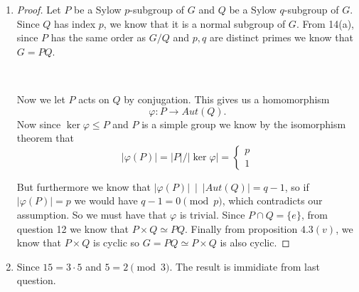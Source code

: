 \begin{exercise}
    \begin{enumerate}[label = (\alph*)]
    \item \begin{proof}
    
    Let $P$ be a Sylow $p$-subgroup of $G$ and $Q$ be a Sylow $q$-subgroup of $G$. Since $Q$ has index $p$, we know that it is a normal subgroup of $G$.
From 14(a), since $P$ has the same order as $G/Q$ and $p,q$ are distinct primes we know that $G = PQ$.

\

Now we let $P$ acts on $Q$ by conjugation. This gives us a homomorphism  \[
    \varphi \colon P \rightarrow Aut(Q)
.\]
Now since $\ker \varphi \leq P$ and $P$ is a simple group we know by the isomorphism theorem that \[|\varphi(P)| = |P|/|\ker \varphi| = \begin{cases}
p\\
1
\end{cases}\]

But furthermore we know that $|\varphi(P)|\ \mid \ |Aut(Q)| = q-1$, so if $|\varphi(P)| = p$ we would have  $q-1 = 0\pmod{p}$, which contradicts our assumption. So we must have that $\varphi$ is trivial.
Since $P\cap Q = \{e\}$, from question 12 we know that $P\times Q \simeq PQ$. 
Finally from proposition $4.3(v)$, we know that  $P\times Q$ is cyclic so $G = PQ \simeq P\times Q$ is also cyclic.
\end{proof}
    \item Since $15 = 3\cdot 5$ and  $5 = 2 \pmod 3$. The result is immidiate from last question.
\end{enumerate}
\end{exercise}


\begin{exercise}


\end{exercise}



